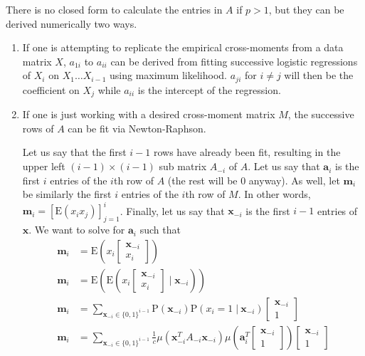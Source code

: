 \documentclass[11pt]{article}
\newcommand{\p}{\mathrm{P}}
\newcommand{\E}{\mathrm{E}}
\newcommand{\st}{ \; \big | \:}
\theoremstyle{definition}
\begin{document}
    There is no closed form to calculate the entries in $A$ if $p>1$, but they can be derived numerically two ways.  
    \begin{enumerate}
        \item If one is attempting to replicate the empirical cross-moments from a data matrix $X$, $a_{1i}$ to $a_{ii}$ can be derived from fitting successive logistic regressions of $X_i$ on $X_{1} \ldots X_{i-1}$ using maximum likelihood. $a_{ji}$ for $i\neq j$ will then be the coefficient on $X_j$ while $a_{ii}$ is the intercept of the regression.
        \item If one is just working with a desired cross-moment matrix $M$, the successive rows of $A$ can be fit via Newton-Raphson. \par
            Let us say that the first $i-1$ rows have already been fit, resulting in the upper left $(i-1)\times(i-1)$ sub matrix $A_{-i}$ of $A$. Let us say that $\mathbf a_i$ is the first $i$ entries of the $i$th row of $A$ (the rest will be 0 anyway). As well, let $\mathbf m_i$ be similarly the first $i$ entries of the $i$th row of $M$. In other words, $\mathbf{m}_i = [\E(x_i x_j)]_{j=1}^{i}$. Finally, let us say that $\mathbf x_{-i}$ is the first $i-1$ entries of $\mathbf x$. We want to solve for $\mathbf a_i$ such that
            \begin{align*}
                \mathbf m_i &= \E\left(x_i \left[\begin{array}{c} \mathbf x_{-i} \\ x_i \end{array}\right]\right) \\
                \mathbf m_i &= \E\left(\E\left(x_i \left[\begin{array}{c} \mathbf x_{-i} \\ x_i \end{array}\right]\;\bigg \vert\; \mathbf x_{-i}\right)\right)\\
                \mathbf m_i &= \sum_{\mathbf x_{-i} \in \{0,1\}^{i-1}} \p(\mathbf x_{-i})\p(x_i=1\st \mathbf x_{-i}) \left[\begin{array}{c} \mathbf x_{-i} \\ 1 \end{array}\right] \\
        \mathbf m_i &= \sum_{\mathbf x_{-i} \in \{0,1\}^{i-1}} \frac{1}{c}\mu\left(\mathbf x_{-i}^TA_{-i}\mathbf x_{-i}\right) \mu\left(\mathbf{a}_i^T\left[\begin{array}{c} \mathbf x_{-i} \\ 1 \end{array}\right]\right)\left[\begin{array}{c} \mathbf x_{-i} \\ 1 \end{array}\right] \\

\end{align*}
\end{enumerate}
\end{document}
